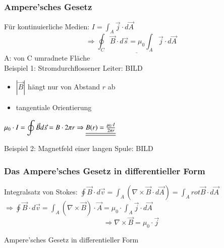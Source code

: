\subsubsection{Ampere'sches Gesetz}
Für kontinuierliche Medien: $ I = {\displaystyle \int_A \vec{j}\cdot d\vec{A}} $\\
$$ \Rightarrow\underline{{\displaystyle\oint_C \vec{B}\cdot d\vec{s} = \mu_0\int_A \vec{j} \cdot d\vec{A}}} $$
A: von C umradnete Fläche\\
\break
Beispiel 1: Stromdurchflossener Leiter:
BILD
\begin{itemize}
	\item $ |\vec{B}| $ hängt nur von Abstand $ r $ ab
	\item tangentiale Orientierung
\end{itemize}
\begin{math}
\mu_0 \cdot I = {\displaystyle\oint\vec{B}d\vec{s}} = B \cdot 2\pi r\\
\Rightarrow \underline{\underline{B(r) = \frac{\mu_0 \cdot I }{2\pi r}}}
\end{math}

\noindent Beispiel 2: Magnetfeld einer langen Spule:
BILD

\subsubsection{Das Ampere'sches Gesetz in differentieller Form}
Integralsatz von Stokes: $ {\displaystyle\oint\vec{B} \cdot d\vec{v} = \int_A (\nabla\times\vec{B} \cdot d \vec{A}) = \int_A rot\vec{B} \cdot d\vec{A}} $ \\
$ \Rightarrow {\displaystyle\oint\vec{B} \cdot d\vec{v} = \int_A (\nabla\times\vec{B}) \cdot\vec{A} = \mu_0 \cdot \int_A \vec{j} \cdot d\vec{A}} $
$$ \boxed{\Rightarrow \nabla\times\vec{B} = \mu_0 \cdot \vec{j}} $$
\begin{center}
	Ampere'sches Gesetz in differentieller Form
\end{center}

